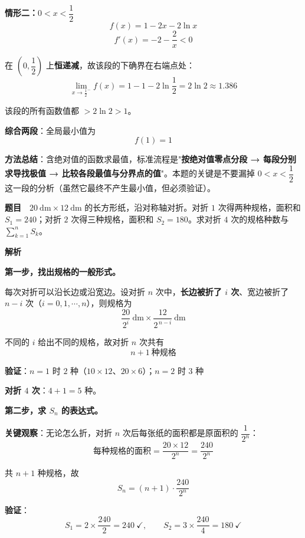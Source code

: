 \par\medskip

\textbf{情形二：$0<x<\dfrac12$}
\[f(x)=1-2x-2\ln x\]
\[f'(x)=-2-\frac2x<0\]

在 $\left(0,\dfrac12\right)$ 上\textbf{恒递减}，故该段的下确界在右端点处：
\[\lim_{x\to\frac12^{-}}f(x)=1-1-2\ln\frac12=2\ln2\approx1.386\]

该段的所有函数值都 $>2\ln2>1$。

\par\medskip

\textbf{综合两段}：全局最小值为
\[f(1)=1\]


\begin{gktip}
\textbf{方法总结}：含绝对值的函数求最值，标准流程是"\textbf{按绝对值零点分段 → 每段分别求导找极值 → 比较各段最值与分界点的值}"。本题的关键是不要漏掉 $0<x<\dfrac12$ 这一段的分析（虽然它最终不产生最小值，但必须验证）。
\end{gktip}

\par\medskip


\textbf{题目}　$20\ \mathrm{dm}\times12\ \mathrm{dm}$ 的长方形纸，沿对称轴对折。对折 $1$ 次得两种规格，面积和 $S_1=240$；对折 $2$ 次得三种规格，面积和 $S_2=180$。求对折 $4$ 次的规格种数与 $\displaystyle\sum_{k=1}^{n}S_k$。

\textbf{解析}

\textbf{第一步，找出规格的一般形式。}

每次对折可以沿长边或沿宽边。设对折 $n$ 次中，\textbf{长边被折了 $i$ 次}、宽边被折了 $n-i$ 次（$i=0,1,\cdots,n$），则规格为
\[\frac{20}{2^{i}}\ \mathrm{dm}\times\frac{12}{2^{\,n-i}}\ \mathrm{dm}\]

不同的 $i$ 给出不同的规格，故对折 $n$ 次共有
\[n+1\ \text{种规格}\]

\textbf{验证}：$n=1$ 时 $2$ 种（$10\times12$、$20\times6$）；$n=2$ 时 $3$ 种 

\textbf{对折 $4$ 次}：$4+1=5$ 种。

\textbf{第二步，求 $S_n$ 的表达式。}

\textbf{关键观察}：无论怎么折，对折 $n$ 次后每张纸的面积都是原面积的 $\dfrac1{2^{n}}$：
\[\text{每种规格的面积}=\frac{20\times12}{2^{n}}=\frac{240}{2^{n}}\]

共 $n+1$ 种规格，故
\[S_n=(n+1)\cdot\frac{240}{2^{n}}\]

\textbf{验证}：
\[S_1=2\times\frac{240}2=240\ \checkmark,\qquad S_2=3\times\frac{240}4=180\ \checkmark\]

